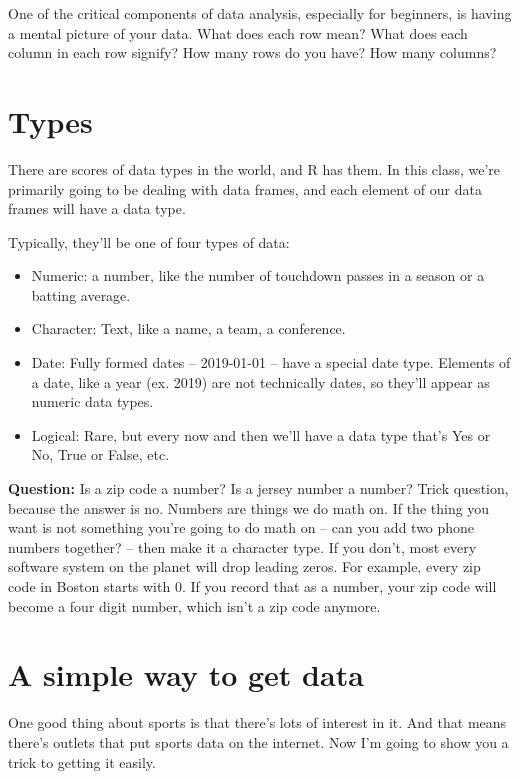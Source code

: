 \documentclass[]{book}
\providecommand{\tightlist}{%
  \setlength{\itemsep}{0pt}\setlength{\parskip}{0pt}}
\begin{document}
One of the critical components of data analysis, especially for beginners, is having a mental picture of your data. What does each row mean? What does each column in each row signify? How many rows do you have? How many columns?

\hypertarget{types}{%
\section{Types}\label{types}}

There are scores of data types in the world, and R has them. In this class, we're primarily going to be dealing with data frames, and each element of our data frames will have a data type.

Typically, they'll be one of four types of data:

\begin{itemize}
\tightlist
\item
  Numeric: a number, like the number of touchdown passes in a season or a batting average.
\item
  Character: Text, like a name, a team, a conference.
\item
  Date: Fully formed dates -- 2019-01-01 -- have a special date type. Elements of a date, like a year (ex. 2019) are not technically dates, so they'll appear as numeric data types.
\item
  Logical: Rare, but every now and then we'll have a data type that's Yes or No, True or False, etc.
\end{itemize}

\textbf{Question:} Is a zip code a number? Is a jersey number a number? Trick question, because the answer is no. Numbers are things we do math on. If the thing you want is not something you're going to do math on -- can you add two phone numbers together? -- then make it a character type. If you don't, most every software system on the planet will drop leading zeros. For example, every zip code in Boston starts with 0. If you record that as a number, your zip code will become a four digit number, which isn't a zip code anymore.

\hypertarget{a-simple-way-to-get-data}{%
\section{A simple way to get data}\label{a-simple-way-to-get-data}}

One good thing about sports is that there's lots of interest in it. And that means there's outlets that put sports data on the internet. Now I'm going to show you a trick to getting it easily.
\end{document}
